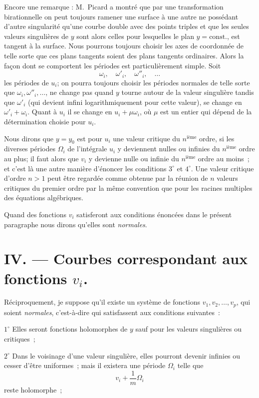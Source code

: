 \documentclass{article}
\begin{document}
Encore une remarque : M.~Picard a montré que par une transformation birationnelle on peut toujours ramener une surface à une autre ne possédant d'autre singularité qu'une courbe double avec des points triples et que les seules valeurs singulières de $y$ sont alors celles pour lesquelles le plan $y = \text{const.}$, est tangent à la surface. Nous pourrons toujours choisir les axes de coordonnée de telle sorte que ces plans tangents soient des plans tangents ordinaires. Alors la façon dont se comportent les périodes est particulièrement simple. Soit
\[
\omega_{i}, \quad \omega'_{i}, \quad \omega''_{i}, \quad \ldots
\]
les périodes de $u_{i}$; on pourra toujours choisir les périodes normales de telle sorte que $\omega_{i}, \omega''_{i}, \ldots$, ne change pas quand $y$ tourne autour de la valeur singulière tandis que $\omega'_{i}$ (qui devient infini logarithmiquement pour cette valeur), se change en $\omega'_{i} + \omega_{i}$. Quant à $u_{i}$ il se change en $u_{i} + \mu \omega_{i}$, où $\mu$ est un entier qui dépend de la détermination choisie pour $u_{i}$.

Nous dirons que $y = y_{0}$ est pour $u_{i}$ une valeur critique du $n^{\text{ième}}$ ordre, si les diverses périodes $\Omega_{i}$ de l'intégrale $u_{i}$ y deviennent nulles ou infinies du $n^{\text{ième}}$ ordre au plus; il faut alors que $v_{i}$ y devienne nulle
ou infinie du $n^{\text{ième}}$ ordre au moins~; et c'est là une autre manière d'énoncer les conditions $3^\circ$ et $4^\circ$. Une valeur critique d'ordre $n > 1$ peut être regardée comme obtenue par la réunion de $n$ valeurs critiques du premier ordre par la même convention que pour les racines multiples des équations algébriques.

Quand des fonctions $v_{i}$ satisferont aux conditions énoncées dans le présent paragraphe nous dirons qu'elles sont \emph{normales}.

\section*{IV. --- Courbes correspondant aux fonctions $v_{i}$.}

Réciproquement, je suppose qu'il existe un système de fonctions $v_{1}, v_{2}, \ldots, v_{p}$, qui soient \emph{normales}, c'est-à-dire qui satisfassent aux conditions suivantes~:

$1^\circ$ Elles seront fonctions holomorphes de $y$ sauf pour les valeurs singulières ou critiques~;

$2^\circ$ Dans le voisinage d'une valeur singulière, elles pourront devenir infinies ou cesser d'être uniformes~; mais il existera une période $\Omega_{i}$ telle que
\[
v_{i} + \frac{1}{m} \Omega_{i}
\]
reste holomorphe~;
\end{document}
